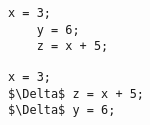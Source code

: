 

\noindent\begin{minipage}{.45\textwidth}
\begin{lstlisting}[style=CStyle, caption=Original source code., label=equivalent1]
	x = 3;
	y = 6;
	z = x + 5;
\end{lstlisting}
\end{minipage}\hfill
\begin{minipage}{.45\textwidth}
\begin{lstlisting}[style=CStyle, caption=Equivalent mutant., label=equivalent2, mathescape=true]
	 x = 3;
$\Delta$ z = x + 5;
$\Delta$ y = 6;
\end{lstlisting}
\end{minipage}
